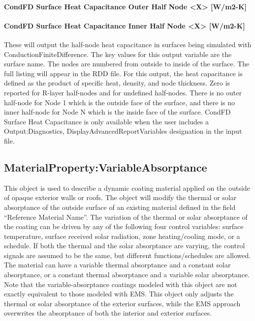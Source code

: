 \paragraph{CondFD Surface Heat Capacitance Outer Half Node \textless{}X\textgreater{} {[}W/m2-K{]}}\label{condfd-surface-heat-capacitance-outer-half-node-x-wm2-k}

\paragraph{CondFD Surface Heat Capacitance Inner Half Node \textless{}X\textgreater{} {[}W/m2-K{]}}\label{condfd-surface-heat-capacitance-inner-half-node-x-wm2-k}

These will output the half-node heat capacitance in surfaces being simulated with ConductionFiniteDifference. The key values for this output variable are the surface name. The nodes are numbered from outside to inside of the surface. The full listing will appear in the RDD file. For this output, the heat capacitance is defined as the product of specific heat, density, and node thickness. Zero is reported for R-layer half-nodes and for undefined half-nodes. There is no outer half-node for Node 1 which is the outside face of the surface, and there is no inner half-node for Node N which is the inside face of the surface. CondFD Surface Heat Capacitance is only available when the user includes a Output:Diagnostics, DisplayAdvancedReportVariables designation in the input file.

\subsection{MaterialProperty:VariableAbsorptance}\label{materialpropertyvariableabsorptance}

This object is used to describe a dynamic coating material applied on the
outside of opaque exterior walls or roofs. The object will modify the thermal
or solar absorptance of the outside surface of an existing material defined in
the field ``Reference Material Name''. The variation of the thermal or solar
absorptance of the coating can be driven by any of the following four control
variables: surface temperature, surface received solar radiation, zone
heating/cooling mode, or a schedule. If both the thermal and the solar
absorptance are varying, the control signals are assumed to be the same, but
different functions/schedules are allowed. The material can have a variable
thermal absorptance and a constant solar absorptance, or a constant thermal
absorptance and a variable solar absorptance. Note that the variable-absorptance
coatings modeled with this object are not exactly equivalent to those modeled
with EMS. This object only adjusts the thermal or solar absorptance of the
exterior surfaces, while the EMS approach overwrites the absorptance of both the
interior and exterior surfaces.

